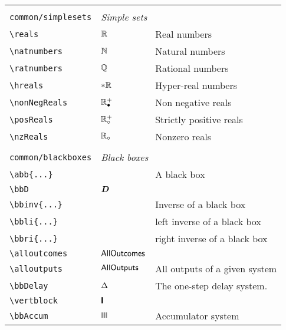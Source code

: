 \begin{longtable}{lll}
  &  & \\ 
 {\color[rgb]{0.5,0.5,0.5}\texttt{common/simplesets}} & \multicolumn{2}{l}{\emph{Simple sets}}\\ 
 \hline
{\color[rgb]{0.5,0.5,0.5}\texttt{\textbackslash reals}} & $\mathbb{R}$ &  Real numbers\\ 
 {\color[rgb]{0.5,0.5,0.5}\texttt{\textbackslash natnumbers}} & $\mathbb{N}$ &  Natural numbers\\ 
 {\color[rgb]{0.5,0.5,0.5}\texttt{\textbackslash ratnumbers}} & $\mathbb{Q}$ &  Rational numbers\\ 
 {\color[rgb]{0.5,0.5,0.5}\texttt{\textbackslash hreals}} & $\ast\mathbb{R}$ &  Hyper-real numbers\\ 
 {\color[rgb]{0.5,0.5,0.5}\texttt{\textbackslash nonNegReals}} & $\mathbb{R}^{+}_{\bullet}$ &  Non negative reals \\ 
 {\color[rgb]{0.5,0.5,0.5}\texttt{\textbackslash posReals}} & $\mathbb{R}^{+}_{\circ}$ &  Strictly positive reals\\ 
 {\color[rgb]{0.5,0.5,0.5}\texttt{\textbackslash nzReals}} & $\mathbb{R}_{\circ}$ &  Nonzero reals\\ 
  &  & \\ 
 {\color[rgb]{0.5,0.5,0.5}\texttt{common/blackboxes}} & \multicolumn{2}{l}{\emph{Black boxes}}\\ 
 \hline
{\color[rgb]{0.5,0.5,0.5}\texttt{\textbackslash abb\{...\}}} &  &  A black box\\ 
 {\color[rgb]{0.5,0.5,0.5}\texttt{\textbackslash bbD}} & $\boldsymbol{D}$ & \\ 
 {\color[rgb]{0.5,0.5,0.5}\texttt{\textbackslash bbinv\{...\}}} &  &  Inverse of a black box\\ 
 {\color[rgb]{0.5,0.5,0.5}\texttt{\textbackslash bbli\{...\}}} &  &  left inverse of a black box\\ 
 {\color[rgb]{0.5,0.5,0.5}\texttt{\textbackslash bbri\{...\}}} &  &  right inverse of a black box\\ 
 {\color[rgb]{0.5,0.5,0.5}\texttt{\textbackslash alloutcomes}} & $\mathsf{AllOutcomes}$ & \\ 
 {\color[rgb]{0.5,0.5,0.5}\texttt{\textbackslash alloutputs}} & $\mathsf{AllOutputs}$ &  All outputs of a given system\\ 
 {\color[rgb]{0.5,0.5,0.5}\texttt{\textbackslash bbDelay}} & $\Delta$ &  The one-step delay system.\\ 
 {\color[rgb]{0.5,0.5,0.5}\texttt{\textbackslash vertblock}} & $\vertblock$ & \\ 
 {\color[rgb]{0.5,0.5,0.5}\texttt{\textbackslash bbAccum}} & $\bbAccum$ &  Accumulator system\\ 

\end{longtable}
